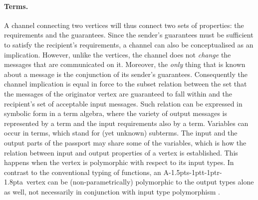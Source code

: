 \documentclass[11pt]{report}
\def\ak{{\textsf{A\kern-1.5pts\kern-1ptt\kern-1ptr\kern-1.8pta}}\kern-2pt{\it K\kern-2ptahn}}
\begin{document}
\paragraph{Terms.} A channel connecting two vertices will thus connect two sets of properties: the requirements and the guarantees. Since the sender's guarantees must be sufficient to satisfy the recipient's requirements, a channel can also be conceptualised as an implication. However, unlike the vertices, the channel does not {\em change} the messages that are communicated on it. Moreover, the {\em only} thing that is known about a message is the conjunction of its sender's guarantees. Consequently the channel implication is equal in force to the subset relation between the set that the messages of the originator vertex are guaranteed to fall within and the recipient's set of acceptable input messages. Such relation can be expressed in symbolic form in a term algebra, where the variety of output messages is represented by a term and the input requirements also by a term. Variables can occur in terms, which stand for (yet unknown) subterms. The input and the output parts of the passport may share some of the variables, which is how the relation between input and output properties of a vertex is established. This happens when the vertex is polymorphic with respect to its input types. In contrast to the conventional typing of functions, an \ak\ vertex can be (non-parametrically) polymorphic to the output types alone as well, not necessarily in conjunction with input type polymorphism .
\end{document}
